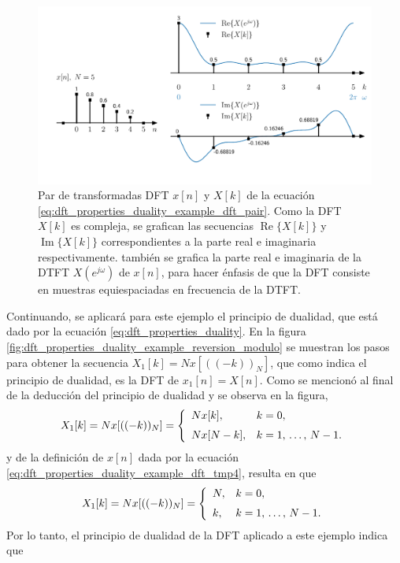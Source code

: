 \documentclass[a4paper]{report}
\renewcommand{\Re}{\operatorname{Re}}
\renewcommand{\Im}{\operatorname{Im}}
\begin{document}
\begin{figure}[!htb]
 \begin{center}
 \includegraphics[width=1\textwidth]{figuras/dft_properties_duality_example_dft_pair.pdf}
 \caption{\label{fig:dft_properties_duality_example_dft_pair} Par de transformadas DFT \(x[n]\) y \(X[k]\) de la ecuación \ref{eq:dft_properties_duality_example_dft_pair}. Como la DFT \(X[k]\) es compleja, se grafican las secuencias \(\Re\{X[k]\}\) y \(\Im\{X[k]\}\) correspondientes a la parte real e imaginaria respectivamente. también se grafica la parte real e imaginaria de la DTFT \(X(e^{j\omega})\) de \(x[n]\), para hacer énfasis de que la DFT consiste en muestras equiespaciadas en frecuencia de la DTFT.}
 \end{center}
\end{figure}
Continuando, se aplicará para este ejemplo el principio de dualidad, que está dado por la ecuación \ref{eq:dft_properties_duality}. En la figura \ref{fig:dft_properties_duality_example_reversion_modulo} se muestran los pasos para obtener la secuencia \(X_1[k]=Nx[((-k))_N]\), que como indica el principio de dualidad, es la DFT de \(x_1[n]=X[n]\). Como se mencionó al final de la deducción del principio de dualidad y se observa en la figura,
\[
 X_1[k]=Nx[((-k))_N]=
 \left\{
 \begin{array}{ll}
  Nx[k], & k=0,\\[\medskipamount]
  Nx[N-k], & k=1,\,\dots,\,N-1.
 \end{array}
 \right.
\]
y de la definición de \(x[n]\) dada por la ecuación \ref{eq:dft_properties_duality_example_dft_tmp4}, resulta en que 
\[
 X_1[k]=Nx[((-k))_N]=
 \left\{
 \begin{array}{ll}
  N, & k=0,\\[\medskipamount]
  k, & k=1,\,\dots,\,N-1.
 \end{array}
 \right.
\]
Por lo tanto, el principio de dualidad de la DFT aplicado a este ejemplo indica que 
\end{document}
